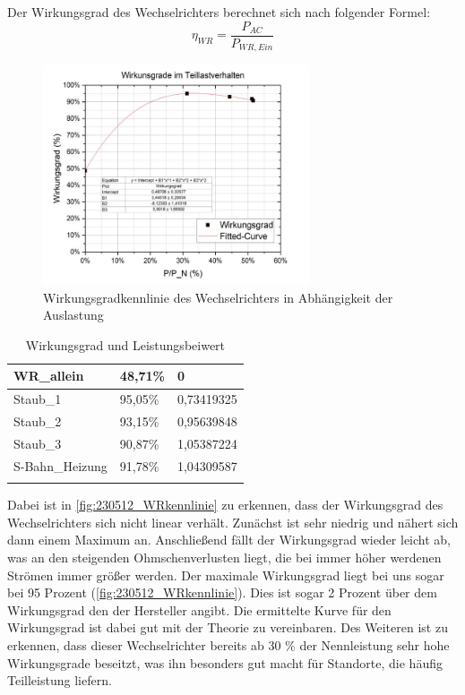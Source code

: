 Der Wirkungsgrad des Wechselrichters berechnet sich nach folgender Formel:
%
\begin{equation}
	\eta_{ WR} = \frac{ P_{AC} }{ P_{WR,Ein} }
	\label{eq:230509_Wirkungsgrad}
\end{equation}
%
%
\begin{figure}[!ht]
		\centering
		\includegraphics[width=0.7\textwidth]{Abbildungen/Kennlinie wr}
		\caption{Wirkungsgradkennlinie des Wechselrichters in Abhängigkeit der Auslastung}
		\label{fig:230512_WRkennlinie}
\end{figure}
%
\begin{table}[]
 \caption{Wirkungsgrad und Leistungsbeiwert}
	\centering
\begin{tabular}{|l|l|l|}
\hline
WR\_allein      & 48,71\% & 0          \\ \hline
Staub\_1        & 95,05\% & 0,73419325 \\ \hline
Staub\_2        & 93,15\% & 0,95639848 \\ \hline
Staub\_3        & 90,87\% & 1,05387224 \\ \hline
S-Bahn\_Heizung & 91,78\% & 1,04309587 \\  \hline
\label{tab:150523_Messtabelle}
\end{tabular}
\end{table}
Dabei ist in \autoref{fig:230512_WRkennlinie} zu erkennen, dass der Wirkungsgrad des Wechselrichters sich nicht linear verhält. Zunächst ist sehr niedrig und nähert sich dann einem Maximum an. Anschließend fällt der Wirkungsgrad wieder leicht ab, was an den steigenden Ohmschenverlusten liegt, die bei immer höher werdenen Strömen immer größer werden. Der maximale Wirkungsgrad liegt bei uns sogar bei 95 Prozent (\autoref{fig:230512_WRkennlinie}). Dies ist sogar 2 Prozent über dem Wirkungsgrad den der Hersteller angibt. Die ermittelte Kurve für den Wirkungsgrad ist dabei gut mit der Theorie zu vereinbaren. Des Weiteren ist zu erkennen, dass dieser Wechselrichter bereits ab 30 \% der Nennleistung sehr hohe Wirkungsgrade beseitzt, was ihn besonders gut macht für Standorte, die häufig Teilleistung liefern.
